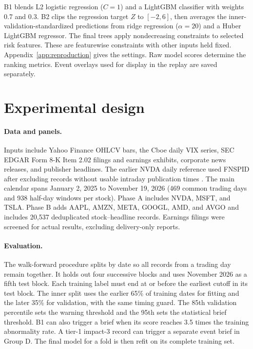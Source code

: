 \documentclass{article}
\begin{document}
B1 blends L2 logistic regression ($C=1$) and a LightGBM classifier \citep{ke2017lightgbm} with weights 0.7 and 0.3. B2 clips the regression target $Z$ to $[-2,6]$, then averages the inner-validation-standardized predictions from ridge regression ($\alpha=20$) and a Huber LightGBM regressor. The final trees apply nondecreasing constraints to selected risk features. These are featurewise constraints with other inputs held fixed. Appendix~\ref{app:reproduction} gives the settings. Raw model scores determine the ranking metrics. Event overlays used for display in the replay are saved separately.



\section{Experimental design}
\label{sec:setup}

\paragraph{Data and panels.}
Inputs include Yahoo Finance OHLCV bars, the Cboe daily VIX series, SEC EDGAR Form 8-K Item 2.02 filings and earnings exhibits, corporate news releases, and publisher headlines. The earlier NVDA daily reference used FNSPID after excluding records without usable intraday publication times \citep{dong2024fnspid}. The main calendar spans January 2, 2025 to November 19, 2026 (469 common trading days and 938 half-day windows per stock). Phase A includes NVDA, MSFT, and TSLA. Phase B adds AAPL, AMZN, META, GOOGL, AMD, and AVGO and includes 20,537 deduplicated stock--headline records. Earnings filings were screened for actual results, excluding delivery-only reports.

\paragraph{Evaluation.}
The walk-forward procedure splits by date so all records from a trading day remain together. It holds out four successive blocks and uses November 2026 as a fifth test block. Each training label must end at or before the earliest cutoff in its test block. The inner split uses the earlier 65\% of training dates for fitting and the later 35\% for validation, with the same timing guard. The 85th validation percentile sets the warning threshold and the 95th sets the statistical brief threshold. B1 can also trigger a brief when its score reaches 3.5 times the training abnormality rate. A tier-1 impact-3 record can trigger a separate event brief in Group D. The final model for a fold is then refit on its complete training set.
\end{document}
